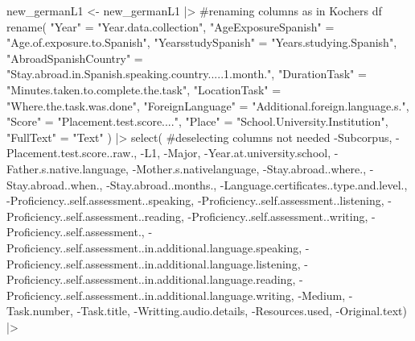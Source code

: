 \documentclass[
  letterpaper,
  DIV=11,
  numbers=noendperiod]{scrartcl}
\newenvironment{Shaded}{\begin{snugshade}}{\end{snugshade}}
\newcommand{\CommentTok}[1]{\textcolor[rgb]{0.37,0.37,0.37}{#1}}
\newcommand{\FunctionTok}[1]{\textcolor[rgb]{0.28,0.35,0.67}{#1}}
\newcommand{\NormalTok}[1]{\textcolor[rgb]{0.00,0.23,0.31}{#1}}
\newcommand{\OtherTok}[1]{\textcolor[rgb]{0.00,0.23,0.31}{#1}}
\newcommand{\SpecialCharTok}[1]{\textcolor[rgb]{0.37,0.37,0.37}{#1}}
\newcommand{\StringTok}[1]{\textcolor[rgb]{0.13,0.47,0.30}{#1}}
\begin{document}
\begin{Shaded}
\begin{Highlighting}[]
\NormalTok{new\_germanL1 }\OtherTok{\textless{}{-}}\NormalTok{ new\_germanL1 }\SpecialCharTok{|\textgreater{}}  \CommentTok{\#renaming columns as in Kochers df}
  \FunctionTok{rename}\NormalTok{(}
    \StringTok{"Year"} \OtherTok{=} \StringTok{"Year.data.collection"}\NormalTok{,}
    \StringTok{"AgeExposureSpanish"} \OtherTok{=} \StringTok{"Age.of.exposure.to.Spanish"}\NormalTok{,}
    \StringTok{"YearsstudySpanish"} \OtherTok{=} \StringTok{"Years.studying.Spanish"}\NormalTok{,}
    \StringTok{"AbroadSpanishCountry"} \OtherTok{=} \StringTok{"Stay.abroad.in.Spanish.speaking.country.....1.month."}\NormalTok{,}
    \StringTok{"DurationTask"} \OtherTok{=} \StringTok{"Minutes.taken.to.complete.the.task"}\NormalTok{,}
    \StringTok{"LocationTask"} \OtherTok{=} \StringTok{"Where.the.task.was.done"}\NormalTok{,}
    \StringTok{"ForeignLanguage"} \OtherTok{=} \StringTok{"Additional.foreign.language.s."}\NormalTok{,}
    \StringTok{"Score"} \OtherTok{=} \StringTok{"Placement.test.score...."}\NormalTok{,}
    \StringTok{"Place"} \OtherTok{=} \StringTok{"School.University.Institution"}\NormalTok{,}
    \StringTok{"FullText"} \OtherTok{=} \StringTok{"Text"}
\NormalTok{  ) }\SpecialCharTok{|\textgreater{}} 
  \FunctionTok{select}\NormalTok{( }\CommentTok{\#deselecting columns not needed}
    \SpecialCharTok{{-}}\NormalTok{Subcorpus, }\SpecialCharTok{{-}}\NormalTok{Placement.test.score..raw., }\SpecialCharTok{{-}}\NormalTok{L1, }\SpecialCharTok{{-}}\NormalTok{Major, }\SpecialCharTok{{-}}\NormalTok{Year.at.university.school, }\SpecialCharTok{{-}}\NormalTok{Father.s.native.language, }\SpecialCharTok{{-}}\NormalTok{Mother.s.nativelanguage, }\SpecialCharTok{{-}}\NormalTok{Stay.abroad..where., }\SpecialCharTok{{-}}\NormalTok{Stay.abroad..when., }\SpecialCharTok{{-}}\NormalTok{Stay.abroad..months., }\SpecialCharTok{{-}}\NormalTok{Language.certificates..type.and.level., }\SpecialCharTok{{-}}\NormalTok{Proficiency..self.assessment..speaking, }\SpecialCharTok{{-}}\NormalTok{Proficiency..self.assessment..listening, }\SpecialCharTok{{-}}\NormalTok{Proficiency..self.assessment..reading, }\SpecialCharTok{{-}}\NormalTok{Proficiency..self.assessment..writing, }\SpecialCharTok{{-}}\NormalTok{Proficiency..self.assessment., }\SpecialCharTok{{-}}\NormalTok{Proficiency..self.assessment..in.additional.language.speaking, }\SpecialCharTok{{-}}\NormalTok{Proficiency..self.assessment..in.additional.language.listening, }\SpecialCharTok{{-}}\NormalTok{Proficiency..self.assessment..in.additional.language.reading, }\SpecialCharTok{{-}}\NormalTok{Proficiency..self.assessment..in.additional.language.writing, }\SpecialCharTok{{-}}\NormalTok{Medium, }\SpecialCharTok{{-}}\NormalTok{Task.number, }\SpecialCharTok{{-}}\NormalTok{Task.title, }\SpecialCharTok{{-}}\NormalTok{Writting.audio.details, }\SpecialCharTok{{-}}\NormalTok{Resources.used, }\SpecialCharTok{{-}}\NormalTok{Original.text) }\SpecialCharTok{|\textgreater{}} 

\end{Highlighting}
\end{Shaded}
\end{document}
